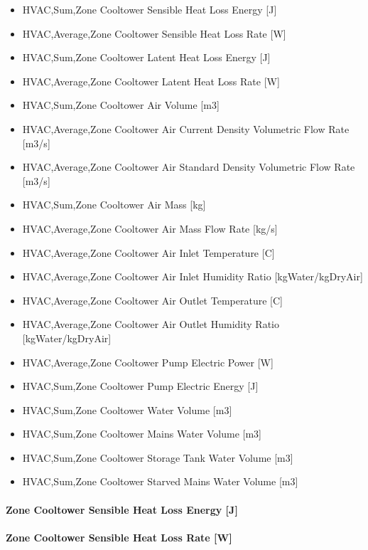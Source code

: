 \begin{itemize}
\item
  HVAC,Sum,Zone Cooltower Sensible Heat Loss Energy {[}J{]}
\item
  HVAC,Average,Zone Cooltower Sensible Heat Loss Rate {[}W{]}
\item
  HVAC,Sum,Zone Cooltower Latent Heat Loss Energy {[}J{]}
\item
  HVAC,Average,Zone Cooltower Latent Heat Loss Rate {[}W{]}
\item
  HVAC,Sum,Zone Cooltower Air Volume {[}m3{]}
\item
  HVAC,Average,Zone Cooltower Air Current Density Volumetric Flow Rate {[}m3/s{]}
\item
  HVAC,Average,Zone Cooltower Air Standard Density Volumetric Flow Rate {[}m3/s{]}
\item
  HVAC,Sum,Zone Cooltower Air Mass {[}kg{]}
\item
  HVAC,Average,Zone Cooltower Air Mass Flow Rate {[}kg/s{]}
\item
  HVAC,Average,Zone Cooltower Air Inlet Temperature {[}C{]}
\item
  HVAC,Average,Zone Cooltower Air Inlet Humidity Ratio {[}kgWater/kgDryAir{]}
\item
  HVAC,Average,Zone Cooltower Air Outlet Temperature {[}C{]}
\item
  HVAC,Average,Zone Cooltower Air Outlet Humidity Ratio {[}kgWater/kgDryAir{]}
\item
  HVAC,Average,Zone Cooltower Pump Electric Power {[}W{]}
\item
  HVAC,Sum,Zone Cooltower Pump Electric Energy {[}J{]}
\item
  HVAC,Sum,Zone Cooltower Water Volume {[}m3{]}
\item
  HVAC,Sum,Zone Cooltower Mains Water Volume {[}m3{]}
\item
  HVAC,Sum,Zone Cooltower Storage Tank Water Volume {[}m3{]}
\item
  HVAC,Sum,Zone Cooltower Starved Mains Water Volume {[}m3{]}
\end{itemize}

\paragraph{Zone Cooltower Sensible Heat Loss Energy {[}J{]}}\label{zone-cooltower-sensible-heat-loss-energy-j}

\paragraph{Zone Cooltower Sensible Heat Loss Rate {[}W{]}}\label{zone-cooltower-sensible-heat-loss-rate-w}

